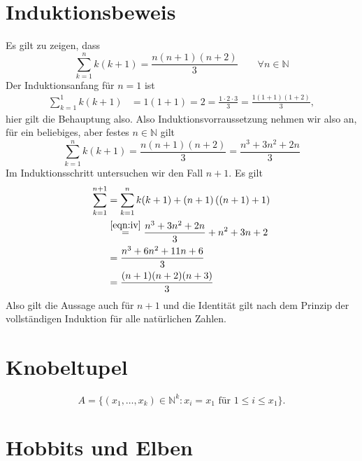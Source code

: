 \documentclass[a4paper]{article}
\begin{document}
\section{Induktionsbeweis}
Es gilt zu zeigen, dass
$$
\sum_{k=1}^n k(k+1) = \frac{n(n+1)(n+2)}{3} \qquad ∀n\in ℕ$$
Der Induktionsanfang für $n=1$ ist
\begin{align*}
    \sum_{k=1}^1 k(k+1) &= 1 (1+1) = 2 = \frac{1\cdot 2 \cdot 3}{3} = \frac{ 1(1+1)(1+2) }{3},
\end{align*}
hier gilt die Behauptung also. Also Induktionsvorraussetzung nehmen wir also an, für ein beliebiges, aber festes $n\in ℕ$ gilt
\begin{equation}\label{eqn:iv}
\sum_{k=1}^n k(k+1) = \frac{n(n+1)(n+2)}{3} = \frac{n^3 + 3n^2 + 2n}{3}\tag{$\star$}
\end{equation}
Im Induktionsschritt untersuchen wir den Fall $n+1$.
Es gilt
\begin{align*}
    \sum_{k=1}^{n+1} &= \sum_{k=1}^n k(k+1) + (n+1)\left( (n+1) + 1 \right) \\
    &\stackrel{\eqref{eqn:iv}}= \frac{n^3 + 3n^2+ 2n}{3} + n^2 + 3n +2\\
    &= \frac{n^3 + 6n^2 + 11 n + 6}{3} \\
    &= \frac{(n+1) (n+2)(n+3) }{3}
\end{align*}
Also gilt die Aussage auch für $n+1$ und die Identität gilt nach dem Prinzip der vollständigen Induktion für alle natürlichen Zahlen.

\section{Knobeltupel}
$$A= \{ (x_1,…, x_k) \in ℕ^k: x_i = x_1\text{ für } 1\le i \le x_1 \}.$$

\setcounter{section}{6}
\section{Hobbits und Elben}
\end{document}
